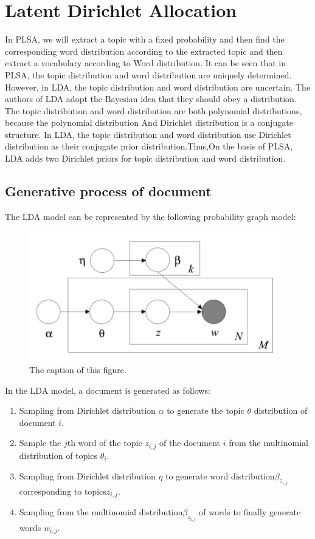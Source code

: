 \section{Latent Dirichlet Allocation}
In PLSA, we will extract a topic with a fixed probability and then find the corresponding word distribution according to the extracted topic and then extract a vocabulary according to Word distribution.
It can be seen that in PLSA, the topic distribution and word distribution are uniquely determined. However, in LDA, the topic distribution and word distribution are uncertain. The authors of LDA adopt the Bayesian idea that they should obey a distribution. The topic distribution and word distribution are both polynomial distributions, because the polynomial distribution And Dirichlet distribution is a conjugate structure. In LDA, the topic distribution and word distribution use Dirichlet distribution as their conjugate prior distribution.Thus,On the basis of PLSA, LDA adds two Dirichlet priors for topic distribution and word distribution.
\subsection{Generative process of document}
The LDA model can be represented by the following probability graph model:
\begin{figure}[htbp]
\includegraphics[width = 15cm]{lda.png}
\caption{The caption of this figure.}
\label{fig:figure1label}
\end{figure}


In the LDA model, a document is generated as follows:
\begin{enumerate}
  \item Sampling from Dirichlet distribution $\alpha$ to generate the topic $\theta$ distribution of document $i$.

  \item Sample the $j$th word of the topic $z_{i,j}$  of the document $i$ from the multinomial distribution of topics $\theta_i$.

  \item Sampling from Dirichlet distribution $\eta$ to generate word distribution$\beta_{z_{i,j}}$ corresponding to topics$z_{i,j}$.

  \item Sampling from the multinomial distribution$\beta_{z_{i,j}}$  of words to finally generate words $w_{i,j}$.

\end{enumerate}

